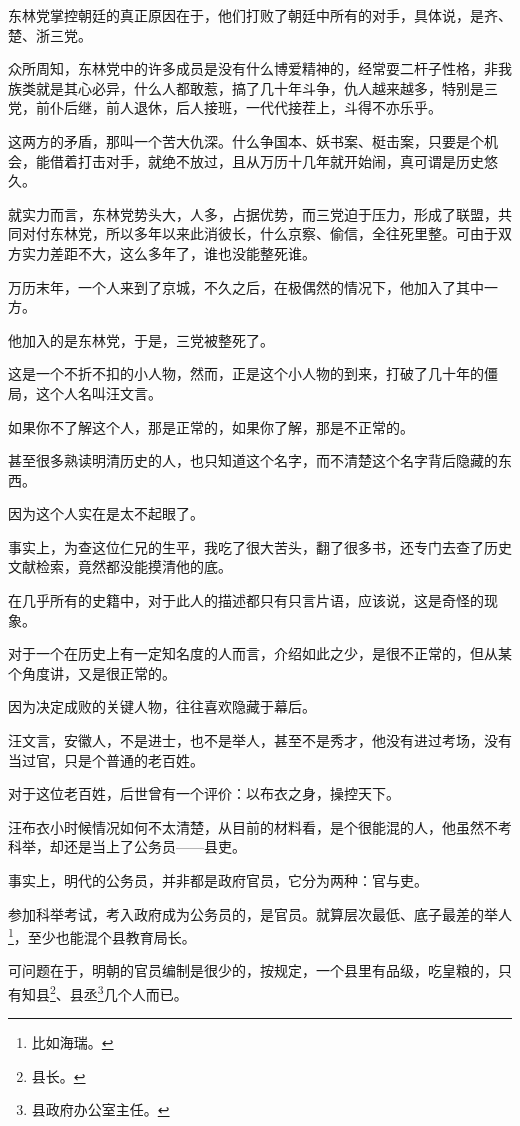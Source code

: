 \begin{multicols}{\theparacolNo}
东林党掌控朝廷的真正原因在于，他们打败了朝廷中所有的对手，具体说，是齐、楚、浙三党。

众所周知，东林党中的许多成员是没有什么博爱精神的，经常耍二杆子性格，非我族类就是其心必异，什么人都敢惹，搞了几十年斗争，仇人越来越多，特别是三党，前仆后继，前人退休，后人接班，一代代接茬上，斗得不亦乐乎。

这两方的矛盾，那叫一个苦大仇深。什么争国本、妖书案、梃击案，只要是个机会，能借着打击对手，就绝不放过，且从万历十几年就开始闹，真可谓是历史悠久。

就实力而言，东林党势头大，人多，占据优势，而三党迫于压力，形成了联盟，共同对付东林党，所以多年以来此消彼长，什么京察、偷信，全往死里整。可由于双方实力差距不大，这么多年了，谁也没能整死谁。

万历末年，一个人来到了京城，不久之后，在极偶然的情况下，他加入了其中一方。

他加入的是东林党，于是，三党被整死了。

这是一个不折不扣的小人物，然而，正是这个小人物的到来，打破了几十年的僵局，这个人名叫汪文言。

如果你不了解这个人，那是正常的，如果你了解，那是不正常的。

甚至很多熟读明清历史的人，也只知道这个名字，而不清楚这个名字背后隐藏的东西。

因为这个人实在是太不起眼了。

事实上，为查这位仁兄的生平，我吃了很大苦头，翻了很多书，还专门去查了历史文献检索，竟然都没能摸清他的底。

在几乎所有的史籍中，对于此人的描述都只有只言片语，应该说，这是奇怪的现象。

对于一个在历史上有一定知名度的人而言，介绍如此之少，是很不正常的，但从某个角度讲，又是很正常的。

因为决定成败的关键人物，往往喜欢隐藏于幕后。

汪文言，安徽人，不是进士，也不是举人，甚至不是秀才，他没有进过考场，没有当过官，只是个普通的老百姓。

对于这位老百姓，后世曾有一个评价：以布衣之身，操控天下。

汪布衣小时候情况如何不太清楚，从目前的材料看，是个很能混的人，他虽然不考科举，却还是当上了公务员——县吏。

事实上，明代的公务员，并非都是政府官员，它分为两种：官与吏。

参加科举考试，考入政府成为公务员的，是官员。就算层次最低、底子最差的举人\footnote{比如海瑞。}，至少也能混个县教育局长。

可问题在于，明朝的官员编制是很少的，按规定，一个县里有品级，吃皇粮的，只有知县\footnote{县长。}、县丞\footnote{县政府办公室主任。}几个人而已。


\end{multicols}
